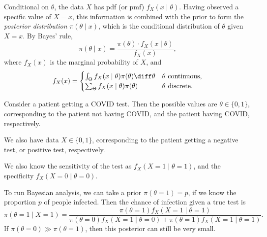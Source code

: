 \documentclass[12pt]{article}
\begin{document}
Conditional on $\theta$, the data $X$ has pdf (or pmf) $f_X(x\mid\theta)$. Having observed a specific value of $X = x$, this information is combined with the prior to form the \emph{posterior distribution} $\pi(\theta \mid x)$, which is the conditional distribution of $\theta$ given $X = x$. By Bayes' rule,
\[
\pi(\theta \mid x) = \frac{\pi(\theta) \cdot f_X(x \mid \theta)}{f_X(x)}
,\]
where $f_X(x)$ is the marginal probability of $X$, and
\[
f_X(x) =
\begin{cases}
	\int_{\Theta} f_X(x \mid \theta) \pi(\theta) \diff \theta & \theta \text{ continuous}, \\
	\sum_{\Theta} f_X(x \mid \theta) \pi(\theta) & \theta \text{ discrete}.
\end{cases}
\]

\begin{exbox}
	Consider a patient getting a COVID test. Then the possible values are $\theta \in \{0, 1\}$, corresponding to the patient not having COVID, and the patient having COVID, respectively.

	We also have data $X \in \{0, 1\}$, corresponding to the patient getting a negative test, or positive test, respectively.

	We also know the sensitivity of the test as $f_X(X = 1 \mid \theta = 1)$, and the specificity $f_X(X = 0 \mid \theta = 0)$.

	To run Bayesian analysis, we can take a prior $\pi(\theta = 1) = p$, if we know the proportion $p$ of people infected. Then the chance of infection given a true test is
	\[
	\pi(\theta = 1 \mid X = 1) = \frac{\pi(\theta = 1) f_X(X=1\mid \theta = 1)}{\pi(\theta = 0) f_X(X = 1\mid \theta = 0) + \pi(\theta = 1) f_X(X = 1 \mid \theta = 1)}
	.\]
	If $\pi(\theta = 0) \gg \pi(\theta = 1)$, then this posterior can still be very small.
\end{exbox}
\end{document}
